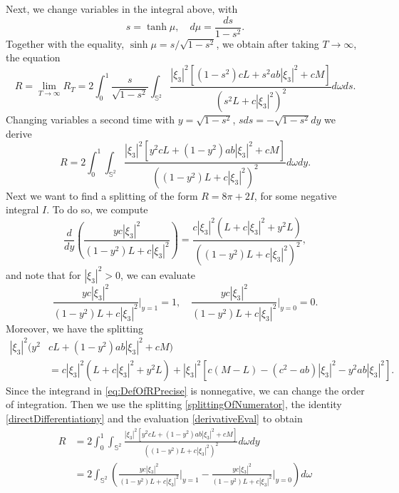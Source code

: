 \documentclass[11pt]{article}
\theoremstyle{plain}
\numberwithin{equation}{section}
\theoremstyle{definition}
\let\oldendproof\endproof
\renewenvironment{proof}[1][\proofname]{%
\oldproof[\upshape \bfseries #1]%
}{\oldendproof}
\def \mb{\mathbb}
\begin{document}
\begin{proof}
\[    \]
    Next, we change variables in the integral above, with 
    \[
    s=\tanh\mu,\quad d\mu=\frac{ds}{1-s^2}.
    \]
    Together with the equality, $\sinh\mu=s/\sqrt{1-s^2}$, we obtain after taking $T \to \infty$, the equation
    \begin{equation*}
        R=\lim_{T \to \infty}R_T=2\int_0^1\frac{s}{\sqrt{1-s^2}}\int_{\mb S^2}\frac{|\xi_3|^2\left[(1-s^2)cL+s^2ab|\xi_3|^2+cM\right]}{(s^2L+c|\xi_3|^2)^2}d\omega ds.
    \end{equation*}
    Changing variables a second time with $y=\sqrt{1-s^2}$, $sds=-\sqrt{1-s^2}dy$ we derive
    \begin{equation}
        \label{eq:DefOfRPrecise}
        R=2\int_0^1\int_{\mb S^2}\frac{|\xi_3|^2\left[y^2cL+(1-y^2)ab|\xi_3|^2+cM\right]}{((1-y^2)L+c|\xi_3|^2)^2}d\omega dy.
    \end{equation}
    Next we want to find a splitting of the form $R=8\pi+2I$, for some negative integral $I$. To do so, we compute
    \begin{equation}
        \label{directDifferentiationy}
        \frac{d}{dy}\left(\frac{yc|\xi_3|^2}{(1-y^2)L+c|\xi_3|^2}\right)=\frac{c|\xi_3|^2(L+c|\xi_3|^2+y^2L)}{((1-y^2)L+c|\xi_3|^2)^2},
    \end{equation}
    and note that for $|\xi_3|^2>0$, we can evaluate
    \begin{equation}
        \label{derivativeEval}
        \frac{yc|\xi_3|^2}{(1-y^2)L+c|\xi_3|^2}\bigg|_{y=1}=1,\quad \frac{yc|\xi_3|^2}{(1-y^2)L+c|\xi_3|^2}\bigg|_{y=0}=0. 
    \end{equation}
    Moreover, we have the splitting
    \begin{align}
        \label{splittingOfNumerator}
        |\xi_3|^2(y^2&cL+(1-y^2)ab|\xi_3|^2+cM)\\
        &=c|\xi_3|^2(L+c|\xi_3|^2+y^2L)+|\xi_3|^2\left[c(M-L)-(c^2-ab)|\xi_3|^2-y^2ab|\xi_3|^2\right].
    \end{align}
    Since the integrand in \eqref{eq:DefOfRPrecise} is nonnegative, we can change the order of integration. Then we use the splitting \eqref{splittingOfNumerator}, the identity \eqref{directDifferentiationy} and the evaluation \eqref{derivativeEval} to obtain
    \begin{align*}
        R&= 2\int_0^1\int_{\mb S^2}\frac{|\xi_3|^2\left[y^2cL+(1-y^2)ab|\xi_3|^2+cM\right]}{((1-y^2)L+c|\xi_3|^2)^2}d\omega dy \\
        &=2\int_{\mb S^2}\left(\frac{yc|\xi_3|^2}{(1-y^2)L+c|\xi_3|^2}\bigg|_{y=1}- \frac{yc|\xi_3|^2}{(1-y^2)L+c|\xi_3|^2}\bigg|_{y=0}\right)d\omega\\

\end{align*}
\end{proof}
\end{document}
